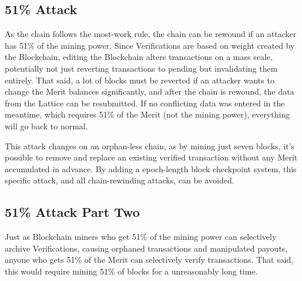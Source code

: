 \documentclass[14pt]{article}
\begin{document}
\label{sec:3.2}
\subsection{51\% Attack}
As the chain follows the most-work rule, the chain can be rewound if an attacker has 51\% of the mining power. Since Verifications are based on weight created by the Blockchain, editing the Blockchain alters transactions on a mass scale, potentially not just reverting transactions to pending but invalidating them entirely. That said, a lot of blocks must be reverted if an attacker wants to change the Merit balances significantly, and after the chain is rewound, the data from the Lattice can be resubmitted. If no conflicting data was entered in the meantime, which requires 51\% of the Merit (not the mining power), everything will go back to normal.

This attack changes on an orphan-less chain, as by mining just seven blocks, it's possible to remove and replace an existing verified transaction without any Merit accumulated in advance. By adding a epoch-length block checkpoint system, this specific attack, and all chain-rewinding attacks, can be avoided.

\label{sec:3.3}
\subsection{51\% Attack Part Two}
Just as Blockchain miners who get 51\% of the mining power can selectively archive Verifications, causing orphaned transactions and manipulated payouts, anyone who gets 51\% of the Merit can selectively verify transactions. That said, this would require mining 51\% of blocks for a unreasonably long time.
\end{document}
